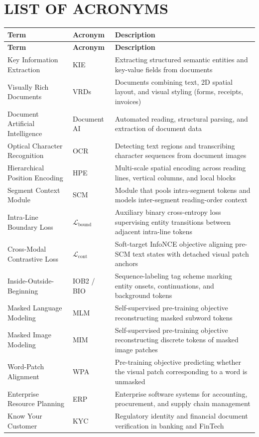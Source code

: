 \chapter*{LIST OF ACRONYMS}

\begingroup
\small
\renewcommand{\arraystretch}{1.25}
\begin{longtable}{|>{\RaggedRight\arraybackslash}p{4.6cm}|>{\Centering\arraybackslash}p{2.2cm}|>{\RaggedRight\arraybackslash}p{7.6cm}|}
\hline
\textbf{Term} & \textbf{Acronym} & \textbf{Description} \\ \hline
\endfirsthead
\hline
\textbf{Term} & \textbf{Acronym} & \textbf{Description} \\ \hline
\endhead
\hline
\endfoot
\hline
\endlastfoot
Key Information Extraction & KIE & Extracting structured semantic entities and key-value fields from documents \\ \hline
Visually Rich Documents & VRDs & Documents combining text, 2D spatial layout, and visual styling (forms, receipts, invoices) \\ \hline
Document Artificial Intelligence & Document AI & Automated reading, structural parsing, and extraction of document data \\ \hline
Optical Character Recognition & OCR & Detecting text regions and transcribing character sequences from document images \\ \hline
Hierarchical Position Encoding & HPE & Multi-scale spatial encoding across reading lines, vertical columns, and local blocks \\ \hline
Segment Context Module & SCM & Module that pools intra-segment tokens and models inter-segment reading-order context \\ \hline
Intra-Line Boundary Loss & $\mathcal{L}_{\text{bound}}$ & Auxiliary binary cross-entropy loss supervising entity transitions between adjacent intra-line tokens \\ \hline
Cross-Modal Contrastive Loss & $\mathcal{L}_{\text{cont}}$ & Soft-target InfoNCE objective aligning pre-SCM text states with detached visual patch anchors \\ \hline
Inside-\allowbreak Outside-\allowbreak Beginning & IOB2 / BIO & Sequence-labeling tag scheme marking entity onsets, continuations, and background tokens \\ \hline
Masked Language Modeling & MLM & Self-supervised pre-training objective reconstructing masked subword tokens \\ \hline
Masked Image Modeling & MIM & Self-supervised pre-training objective reconstructing discrete tokens of masked image patches \\ \hline
Word-Patch Alignment & WPA & Pre-training objective predicting whether the visual patch corresponding to a word is unmasked \\ \hline
Enterprise Resource Planning & ERP & Enterprise software systems for accounting, procurement, and supply chain management \\ \hline
Know Your Customer & KYC & Regulatory identity and financial document verification in banking and FinTech \\ \hline
\end{longtable}
\endgroup
